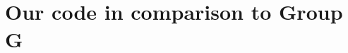 \documentclass[a4paper, 12pt]{report}
\begin{document}



\chapter{Our code in comparison to Group G}



\end{document}
